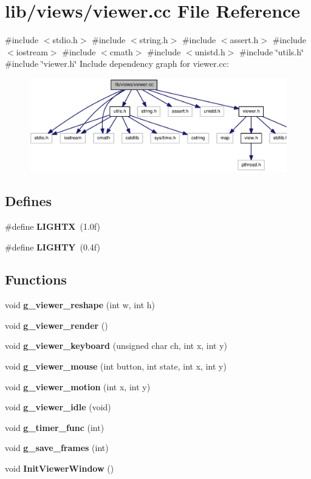 \section{lib/views/viewer.cc \-File \-Reference}
\label{viewer_8cc}
{\ttfamily \#include $<$stdio.\-h$>$}\*
{\ttfamily \#include $<$string.\-h$>$}\*
{\ttfamily \#include $<$assert.\-h$>$}\*
{\ttfamily \#include $<$iostream$>$}\*
{\ttfamily \#include $<$cmath$>$}\*
{\ttfamily \#include $<$unistd.\-h$>$}\*
{\ttfamily \#include \char`\"{}utils.\-h\char`\"{}}\*
{\ttfamily \#include \char`\"{}viewer.\-h\char`\"{}}\*
\-Include dependency graph for viewer.\-cc\-:\nopagebreak
\begin{figure}[H]
\begin{center}
\leavevmode
\includegraphics[width=350pt]{viewer_8cc__incl}
\end{center}
\end{figure}
\subsection*{\-Defines}
\begin{DoxyCompactItemize}
\item 
\#define {\bf \-L\-I\-G\-H\-T\-X}~(1.\-0f)
\item 
\#define {\bf \-L\-I\-G\-H\-T\-Y}~(0.\-4f)
\end{DoxyCompactItemize}
\subsection*{\-Functions}
\begin{DoxyCompactItemize}
\item 
void {\bf g\-\_\-viewer\-\_\-reshape} (int w, int h)
\item 
void {\bf g\-\_\-viewer\-\_\-render} ()
\item 
void {\bf g\-\_\-viewer\-\_\-keyboard} (unsigned char ch, int x, int y)
\item 
void {\bf g\-\_\-viewer\-\_\-mouse} (int button, int state, int x, int y)
\item 
void {\bf g\-\_\-viewer\-\_\-motion} (int x, int y)
\item 
void {\bf g\-\_\-viewer\-\_\-idle} (void)
\item 
void {\bf g\-\_\-timer\-\_\-func} (int)
\item 
void {\bf g\-\_\-save\-\_\-frames} (int)
\item 
void {\bf \-Init\-Viewer\-Window} ()
\end{DoxyCompactItemize}


